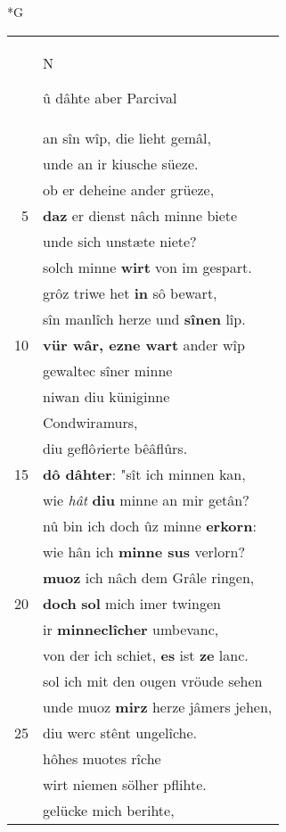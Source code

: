 \documentclass[8pt,a4paper,notitlepage]{article}
\begin{document}
\begin{table}[ht]
\begin{minipage}[t]{0.5\linewidth}
\small
\begin{center}*G
\end{center}
\begin{tabular}{rl}
 & \begin{large}N\end{large}û dâhte aber Parcival\\ 
 & an sîn wîp, die lieht gemâl,\\ 
 & unde an ir kiusche süeze.\\ 
 & ob er deheine ander grüeze,\\ 
5 & \textbf{daz} er dienst nâch minne biete\\ 
 & unde sich unstæte niete?\\ 
 & solch minne \textbf{wirt} von im gespart.\\ 
 & grôz triwe het \textbf{in} sô bewart,\\ 
 & sîn manlîch herze und \textbf{sînen} lîp.\\ 
10 & \textbf{vür wâr, ezne wart} ander wîp\\ 
 & gewaltec sîner minne\\ 
 & niwan diu küniginne\\ 
 & Condwiramurs,\\ 
 & diu geflô\textit{r}ierte bêâflûrs.\\ 
15 & \textbf{dô dâhter}: "sît ich minnen kan,\\ 
 & wie \textit{hât} \textbf{diu} minne an mir getân?\\ 
 & nû bin ich doch ûz minne \textbf{erkorn}:\\ 
 & wie hân ich \textbf{minne sus} verlorn?\\ 
 & \textbf{muoz} ich nâch dem Grâle ringen,\\ 
20 & \textbf{doch} \textbf{sol} mich imer twingen\\ 
 & ir \textbf{minneclîcher} umbevanc,\\ 
 & von der ich schiet, \textbf{es} ist \textbf{ze} lanc.\\ 
 & sol ich mit den ougen vröude sehen\\ 
 & unde muoz \textbf{mirz} herze jâmers jehen,\\ 
25 & diu werc stênt ungelîche.\\ 
 & hôhes muotes rîche\\ 
 & wirt niemen sölher pflihte.\\ 
 & gelücke mich berihte,\\ 

\end{tabular}
\end{minipage}
\end{table}
\end{document}
